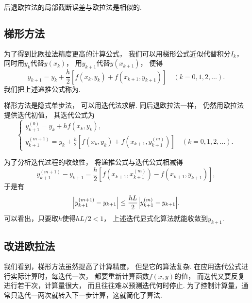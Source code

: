 后退欧拉法的局部截断误差与欧拉法是相似的.

\subsection{梯形方法}
为了得到比欧拉法精度更高的计算公式，
我们可以用梯形公式近似代替积分\(I_k\)，
同时用\(y_k\)代替\(y(x_k)\)，
用\(y_{k+1}\)代替\(y(x_{k+1})\)，
便得\begin{equation*}
	y_{k+1}
	= y_k
	+ \frac{h}{2}
	[
		f(x_k,y_k)
		+ f(x_{k+1},y_{k+1})
	]
	\quad(k=0,1,2,\dotsc).
\end{equation*}
我们把上述递推公式称为.

梯形方法是隐式单步法，
可以用迭代法求解.
同后退欧拉法一样，
仍然用欧拉法提供迭代初值，
其迭代公式为\begin{equation}
	\begin{cases}
		y_{k+1}^{(0)}
		= y_k
		+ h f(x_k,y_k), \\
		y_{k+1}^{(m+1)}
		= y_k
		+ \frac{h}{2}
		[
			f(x_k,y_k)
			+ f(x_{k+1},y_{k+1}^{(m)})
		]
		\quad(k=0,1,2,\dotsc).
	\end{cases}
\end{equation}

为了分析迭代过程的收敛性，
将递推公式与迭代公式相减得\begin{equation*}
	y_{k+1}^{(m+1)}
	- y_{k+1}
	= \frac{h}{2}
	[
		f(x_{k+1},x_{k+1}^{(m)})
		- f(x_{k+1},y_{k+1})
	],
\end{equation*}
于是有\begin{equation*}
	\abs{
		y_{k+1}^{(m+1)}
		- y_{k+1}
	}
	\leq \frac{h L}{2}
	\abs{
		y_{k+1}^{(m)}
		- y_{k+1}
	}.
\end{equation*}
可以看出，只要取\(h\)使得\(h L / 2 < 1\)，
上述迭代显式化算法就能收敛到\(y_{k+1}\).

\subsection{改进欧拉法}
我们看到，梯形方法虽然提高了计算精度，
但是它的算法复杂.
在应用迭代公式进行实际计算时，每迭代一次，
都要重新计算函数\(f(x,y)\)的值，
而迭代又要反复进行若干次，计算量很大，
而且往往难以预测迭代何时停止.
为了控制计算量，通常只迭代一两次就转入下一步计算，这就简化了算法.

